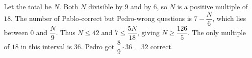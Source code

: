 Let the total be $N$. Both $N$ divisible by $9$ and by $6$, so $N$ is a positive multiple of $18$. The number of Pablo-correct but Pedro-wrong questions is $7-\dfrac{N}{6}$, which lies between $0$ and $\dfrac{N}{9}$. Thus $N\le42$ and $7\le\dfrac{5N}{18}$, giving $N\ge\dfrac{126}{5}$. The only multiple of $18$ in this interval is $36$. Pedro got $\dfrac{8}{9}\cdot36=\boxed{32}$ correct.

